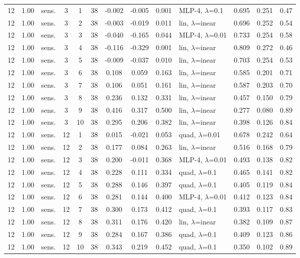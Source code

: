 \documentclass[10pt]{article}
\begin{document}
\begin{scriptsize}
\begin{longtable}{cclcc c ccc l ccc}
12 & 1.00 & sens. & 3 & 1 & 38 & -0.002 & -0.005 & 0.001 & MLP-4, $\lambda$=0.1 & 0.695 & 0.251 & 0.47 \\
12 & 1.00 & sens. & 3 & 2 & 38 & -0.003 & -0.019 & 0.011 & lin, $\lambda$=inear & 0.696 & 0.252 & 0.54 \\
12 & 1.00 & sens. & 3 & 3 & 38 & -0.040 & -0.165 & 0.044 & MLP-4, $\lambda$=0.01 & 0.733 & 0.254 & 0.58 \\
12 & 1.00 & sens. & 3 & 4 & 38 & -0.116 & -0.329 & 0.001 & lin, $\lambda$=inear & 0.809 & 0.272 & 0.46 \\
12 & 1.00 & sens. & 3 & 5 & 38 & -0.009 & -0.037 & 0.010 & lin, $\lambda$=inear & 0.703 & 0.254 & 0.53 \\
12 & 1.00 & sens. & 3 & 6 & 38 & 0.108 & 0.059 & 0.163 & lin, $\lambda$=inear & 0.585 & 0.201 & 0.71 \\
12 & 1.00 & sens. & 3 & 7 & 38 & 0.106 & 0.051 & 0.161 & lin, $\lambda$=inear & 0.587 & 0.203 & 0.70 \\
12 & 1.00 & sens. & 3 & 8 & 38 & 0.236 & 0.132 & 0.331 & lin, $\lambda$=inear & 0.457 & 0.150 & 0.79 \\
12 & 1.00 & sens. & 3 & 9 & 38 & 0.416 & 0.317 & 0.500 & lin, $\lambda$=inear & 0.277 & 0.080 & 0.89 \\
12 & 1.00 & sens. & 3 & 10 & 38 & 0.295 & 0.206 & 0.382 & lin, $\lambda$=inear & 0.398 & 0.126 & 0.84 \\
12 & 1.00 & sens. & 12 & 1 & 38 & 0.015 & -0.021 & 0.053 & quad, $\lambda$=0.01 & 0.678 & 0.242 & 0.64 \\
12 & 1.00 & sens. & 12 & 2 & 38 & 0.177 & 0.084 & 0.263 & lin, $\lambda$=inear & 0.516 & 0.168 & 0.79 \\
12 & 1.00 & sens. & 12 & 3 & 38 & 0.200 & -0.011 & 0.368 & MLP-4, $\lambda$=0.01 & 0.493 & 0.138 & 0.82 \\
12 & 1.00 & sens. & 12 & 4 & 38 & 0.228 & 0.111 & 0.334 & quad, $\lambda$=0.1 & 0.465 & 0.141 & 0.82 \\
12 & 1.00 & sens. & 12 & 5 & 38 & 0.288 & 0.146 & 0.397 & quad, $\lambda$=0.1 & 0.405 & 0.119 & 0.84 \\
12 & 1.00 & sens. & 12 & 6 & 38 & 0.281 & 0.144 & 0.400 & MLP-4, $\lambda$=0.01 & 0.412 & 0.123 & 0.84 \\
12 & 1.00 & sens. & 12 & 7 & 38 & 0.300 & 0.173 & 0.412 & quad, $\lambda$=0.1 & 0.393 & 0.117 & 0.83 \\
12 & 1.00 & sens. & 12 & 8 & 38 & 0.311 & 0.176 & 0.420 & lin, $\lambda$=inear & 0.382 & 0.109 & 0.87 \\
12 & 1.00 & sens. & 12 & 9 & 38 & 0.284 & 0.167 & 0.386 & quad, $\lambda$=0.1 & 0.409 & 0.123 & 0.86 \\
12 & 1.00 & sens. & 12 & 10 & 38 & 0.343 & 0.219 & 0.452 & quad, $\lambda$=0.1 & 0.350 & 0.102 & 0.89 \\
\end{longtable}
\end{scriptsize}
\end{document}
